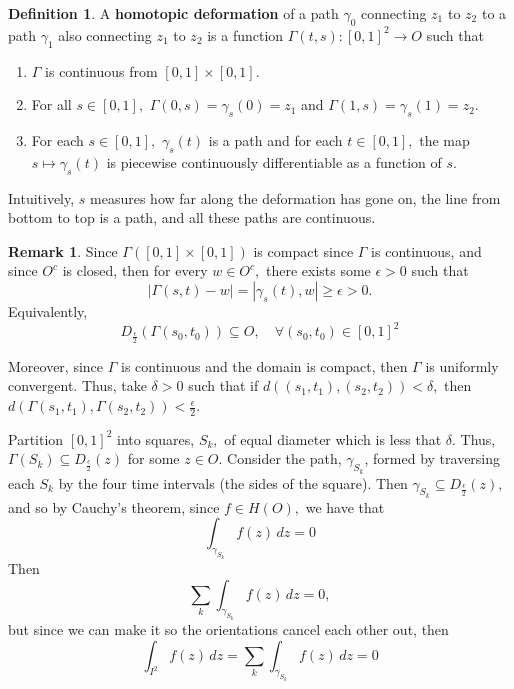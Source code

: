\documentclass[10pt, oneside]{article}
\theoremstyle{definition}
\newtheorem{defn}{Definition}
\newtheorem{rem}{Remark}
\begin{document}
\begin{defn}
    A \textbf{homotopic deformation} of a path $\gamma_0$ connecting $z_1$ to $z_2$ to a path $\gamma_1$ also connecting $z_1$ to $z_2$ is a function $\Gamma(t,s): [0,1]^2 \to O$ such that     \begin{enumerate}
        \item $\Gamma$ is continuous from $[0,1]\times [0,1].$
        \item For all $s\in [0,1],$ $\Gamma(0,s) = \gamma_s(0) = z_1$ and $\Gamma(1,s) = \gamma_s(1) = z_2.$
        \item For each $s\in [0,1],$ $\gamma_s(t)$ is a path and for each $t\in [0,1],$ the map $s\mapsto \gamma_s(t)$ is piecewise continuously differentiable as a function of $s.$
    \end{enumerate}
\end{defn}
Intuitively, $s$ measures how far along the deformation has gone on, the line from bottom to top is a path, and all these paths are continuous. 
\begin{rem}
    Since $\Gamma([0,1]\times [0,1])$ is compact since $\Gamma$ is continuous, and since $O^c$ is closed, then for every $w\in O^c,$ there exists some $\epsilon>0$ such that 
    \[|\Gamma(s,t) - w| = |\gamma_s(t), w| \geq \epsilon >0.\]
    Equivalently, 
    \[D_{\frac{\epsilon}{2}}(\Gamma(s_0, t_0)) \subseteq O, \quad \forall (s_0, t_0) \in [0,1]^2\]

    Moreover, since $\Gamma$ is continuous and the domain is compact, then $\Gamma$ is uniformly convergent. Thus, take $\delta>0$ such that if $d((s_1, t_1), (s_2, t_2))< \delta,$ then $d(\Gamma(s_1, t_1), \Gamma(s_2, t_2)) < \frac{\epsilon}{2}.$ 

    Partition $[0,1]^2$ into squares, $S_k,$ of equal diameter which is less that $\delta.$ Thus, $\Gamma(S_k)\subseteq D_{\frac{\epsilon}{2}}(z)$ for some $z \in O.$ Consider the path, $\gamma_{S_k}$,  formed by traversing each $S_k$  by the four time intervals (the sides of the square). Then $\gamma_{S_k}\subseteq D_{\frac{\epsilon}{2}}(z),$ and so by Cauchy's theorem, since $f\in H(O),$ we have that 
    \[\int_{\gamma_{S_k}}f(z)\, dz = 0\] Then 
    \[\sum_k \int_{\gamma_{S_k}}f(z)\, dz = 0,\] but since we can make it so the orientations cancel each other out, then  
    \[ \int_{I^2}f(z)\, dz= \sum_k \int_{\gamma_{S_k}}f(z)\, dz = 0\]

    
\end{rem}
\end{document}
